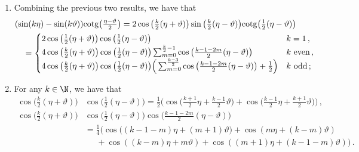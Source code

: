 \documentclass[a4paper,reqno,10pt]{article}
\begin{document}
\begin{enumerate}
\begin{align}
	\sin(k\alpha) & = \frac{1}{2\im}e^{\im k \alpha} \big( 1- e^{-2\im k\alpha} \big)  = \frac{1}{2\im} e^{\im k\alpha} (1-e^{2\im\alpha}) \sum_{m=0}^{k-1} e^{-2\im m\alpha} \\
	& = \sin(\alpha)  \sum_{m=0}^{k-1} e^{\im(k-1-2m)\alpha} \\
	& = \begin{cases}
		\sin(\alpha) & k=1 \,, \\
		2 \sin(\alpha) \sum_{m=0}^{\lfloor \frac{k}{2} \rfloor -1 }\cos((k-1-2m)\alpha) & k \ {\rm even} \,, \\
		2 \sin(\alpha) \sum_{m=0}^{\lfloor \frac{k}{2} \rfloor -1}\big( \cos((k-1-2m)\alpha) +\tfrac12 \big)& k \ {\rm odd} \,;
	\end{cases}
	\end{align}
	\item 
Combining the previous two results, we have that
	\begin{equation}
		\begin{aligned}
			&	(\sin(k\eta)-\sin(k\vartheta)) {\rm cotg} \big( \tfrac{\eta-\vartheta}{2} \big) = 2 \cos\big(\tfrac{k}{2}(\eta+ \vartheta)\big) \sin\big(\tfrac{k}{2}(\eta-\vartheta)\big) {\rm cotg} \big(\tfrac12 (\eta-\vartheta)\big) \\
			&\quad  = \begin{cases}
				2 \cos\big(\tfrac{1}{2}(\eta+ \vartheta)\big) \cos\big(\tfrac{1}{2}(\eta- \vartheta)\big)  & k=1 \,, \\
				4 \cos\big(\tfrac{k}{2}(\eta+ \vartheta)\big)\cos\big(\tfrac{1}{2}(\eta- \vartheta)\big)\sum_{m=0}^{\frac{k}{2}-1} \cos\big(\tfrac{k-1-2m}{2}(\eta- \vartheta)\big) & k \ {\rm even} \,,\\
				4 \cos\big(\tfrac{k}{2}(\eta+ \vartheta)\big) \cos\big(\tfrac{1}{2}(\eta- \vartheta)\big)\Big( \sum_{m=0}^{\frac{k-3}{2}} \cos\big(\tfrac{k-1-2m}{2}(\eta- \vartheta)\big) +\tfrac12 \Big) & k \ {\rm odd} \,;
			\end{cases}
		\end{aligned}
	\end{equation}
	\item For any $k\in\N$, we have that
	\begin{equation}
		\begin{aligned}
			\cos\big(\tfrac{k}{2}(\eta+ \vartheta)\big)& \cos\big(\tfrac{1}{2}(\eta- \vartheta)\big) = \tfrac12 \Big( \cos\big( \tfrac{k+1}{2}\eta + \tfrac{k-1}{2}\vartheta \big)  + \cos\big(\tfrac{k-1}{2}\eta + \tfrac{k+1}{2}\vartheta\big)\Big) \,, \\
			\cos\big(\tfrac{k}{2}(\eta+ \vartheta)\big)& \cos\big(\tfrac{1}{2}(\eta- \vartheta)\big)\cos\big(\tfrac{k-1-2m}{2}(\eta- \vartheta)\big) \\
			& = \tfrac14 \Big( \cos\big( (k-1-m)\eta + (m+1)\vartheta \big)  + \cos(m\eta+ (k-m)\vartheta) \\
			& \quad \ \,+ \cos((k-m)\eta+m\vartheta) + \cos((m+1)\eta+(k-1-m)\vartheta) \Big)\,.
		\end{aligned}
	\end{equation}
\end{enumerate}
\end{document}
